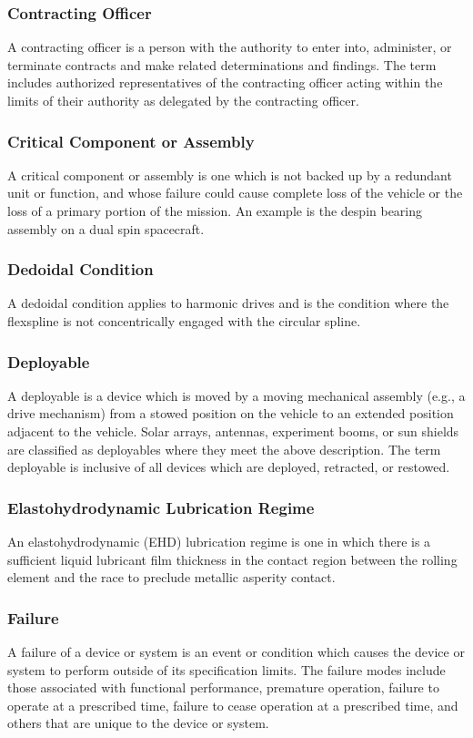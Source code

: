\documentclass[12pt]{article}
\begin{document}
\subsubsection{Contracting Officer}
A contracting officer is a person with the authority to enter into, administer, or terminate contracts and make related determinations and findings. 
The term includes authorized representatives of the contracting officer acting within the limits of their authority as delegated by the contracting officer.

\subsubsection{Critical Component or Assembly}
A critical component or assembly is one which is not backed up by a redundant unit or function, and whose failure could cause complete loss of the vehicle or the loss of a primary portion of the mission. 
An example is the despin bearing assembly on a dual spin spacecraft.

\subsubsection{Dedoidal Condition}
A dedoidal condition applies to harmonic drives and is the condition where the flexspline is not concentrically engaged with the circular spline.

\subsubsection{Deployable}
A deployable is a device which is moved by a moving mechanical assembly (e.g., a drive mechanism) from a stowed position on the vehicle to an extended position adjacent to the vehicle. 
Solar arrays, antennas, experiment booms, or sun shields are classified as deployables where they meet the above description. 
The term deployable is inclusive of all devices which are deployed, retracted, or restowed.

\subsubsection{Elastohydrodynamic Lubrication Regime}
An elastohydrodynamic (EHD) lubrication regime is one in which there is a sufficient liquid lubricant film thickness in the contact region between the rolling element and the race to preclude metallic asperity contact.

\subsubsection{Failure}
A failure of a device or system is an event or condition which causes the device or system to perform outside of its specification limits. 
The failure modes include those associated with functional performance, premature operation, failure to operate at a prescribed time, failure to cease operation at a prescribed time, and others that are unique to the device or system.
\end{document}
